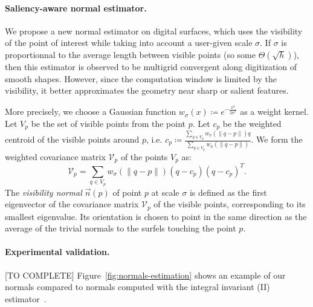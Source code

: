 \newcommand{\Kernel}[1]{\ensuremath{w_{\sigma}(#1)}}

\paragraph{Saliency-aware normal estimator.}
We propose a new normal estimator on digital surfaces, which uses
the visibility of the point of interest while taking into account
a user-given scale $\sigma$. If $\sigma$ is proportionnal to the
average length between visible points (so some
$\Theta\left(\sqrt{h}\right)$), then this estimator is observed to be
multigrid convergent along digitization of smooth shapes. However,
since the computation window is limited by the visibility, it
better approximates the geometry near sharp or salient features.

More precisely, we choose a Gaussian function
$\Kernel{x}\coloneqq e^{-\frac{x^2}{2\sigma^2}}$ as a weight kernel. Let
$V_p$ be the set of visible points from the point $p$. Let $c_p$
be the weighted centroid of the visible points around $p$,
i.e. $c_p \coloneqq \frac{\sum_{q \in V_p} \Kernel{\|q-p\|}q}{\sum_{q \in
V_p} \Kernel{\|q-p\|}}$. We form the weighted covariance matrix
$\mathcal{V}_p$ of the points $V_p$ as:
\begin{equation}
    \mathcal{V}_p = \sum_{q \in V_p} \Kernel{\|q-p\|}(q - c_p)(q - c_p)^T.
\end{equation}
The \emph{visibility normal} $\vec{n}(p)$ of point $p$ at scale $\sigma$ is defined
as the first eigenvector of the covariance matrix $\mathcal{V}_p$
of the visible points, corresponding to its smallest
eigenvalue. Its orientation is chosen to point in the same
direction as the average of the trivial normals to the surfels
touching the point $p$.


\paragraph{Experimental validation.} [TO COMPLETE]
Figure~\ref{fig:normals-estimation} shows an example
of our normals compared to normals computed with the integral invariant (II) estimator~\cite{Lachaud:2017-lnm}.


